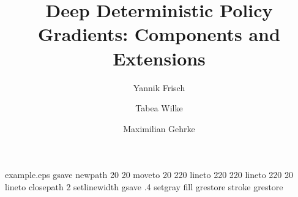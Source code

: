 %
%
%
%
%
\begin{filecontents*}{example.eps}
gsave
newpath
  20 20 moveto
  20 220 lineto
  220 220 lineto
  220 20 lineto
closepath
2 setlinewidth
gsave
  .4 setgray fill
grestore
stroke
grestore
\end{filecontents*}
%
\RequirePackage{fix-cm}
%
\documentclass[smallextended, natbib]{svjour3}       %
%
\smartqed  %
%

\usepackage{graphicx}
\usepackage{amsmath}
\usepackage{algorithm}
\usepackage{algorithmic}
\renewcommand{\algorithmicrequire}{\textbf{Initialize:}}

%
%
%
%
%


\title{Deep Deterministic Policy Gradients: Components and Extensions
}
\subtitle{}


\author{Yannik Frisch \and Tabea Wilke \and Maximilian Gehrke %
}


